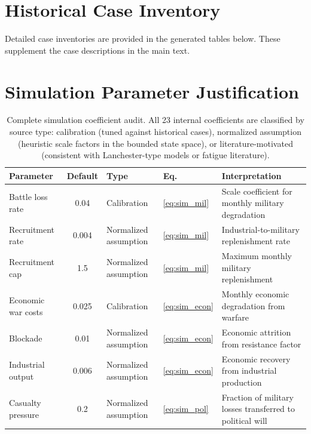 \section{Historical Case Inventory}
\label{app:case_inventory}

Detailed case inventories are provided in the generated tables below. These supplement the case descriptions in the main text.



\section{Simulation Parameter Justification}
\label{app:parameters}

\begin{table}[H]
\centering
\caption{Complete simulation coefficient audit. All 23 internal coefficients are classified by source type: calibration (tuned against historical cases), normalized assumption (heuristic scale factors in the bounded state space), or literature-motivated (consistent with Lanchester-type models or fatigue literature).}
\label{tab:parameters}
\scriptsize
\setlength{\tabcolsep}{2pt}
\renewcommand{\arraystretch}{1.05}
\begin{tabularx}{\textwidth}{@{}l c l l X@{}}
\toprule
\textbf{Parameter} & \textbf{Default} & \textbf{Type} & \textbf{Eq.} & \textbf{Interpretation} \\
\midrule
Battle loss rate & 0.04 & Calibration & \ref{eq:sim_mil} & Scale coefficient for monthly military degradation \\
Recruitment rate & 0.004 & Normalized assumption & \ref{eq:sim_mil} & Industrial-to-military replenishment rate \\
Recruitment cap & 1.5 & Normalized assumption & \ref{eq:sim_mil} & Maximum monthly military replenishment \\
Economic war costs & 0.025 & Calibration & \ref{eq:sim_econ} & Monthly economic degradation from warfare \\
Blockade & 0.01 & Normalized assumption & \ref{eq:sim_econ} & Economic attrition from resistance factor \\
Industrial output & 0.006 & Normalized assumption & \ref{eq:sim_econ} & Economic recovery from industrial production \\
Casualty pressure & 0.2 & Normalized assumption & \ref{eq:sim_pol} & Fraction of military losses transferred to political will \\

\end{tabularx}
\end{table}
